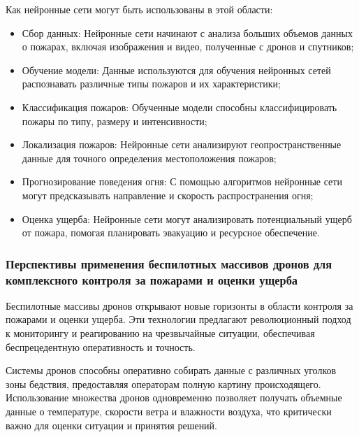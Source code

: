 Как нейронные сети могут быть использованы в этой области:
\begin{itemize}
	\item Сбор данных: Нейронные сети начинают с анализа больших объемов данных о пожарах, включая изображения и видео, полученные с дронов и спутников;
	\item Обучение модели: Данные используются для обучения нейронных сетей распознавать различные типы пожаров и их характеристики;
	\item Классификация пожаров: Обученные модели способны классифицировать пожары по типу, размеру и интенсивности;
	\item Локализация пожаров: Нейронные сети анализируют геопространственные данные для точного определения местоположения пожаров;
	\item Прогнозирование поведения огня: С помощью алгоритмов нейронные сети могут предсказывать направление и скорость распространения огня;
	\item Оценка ущерба: Нейронные сети могут анализировать потенциальный ущерб от пожара, помогая планировать эвакуацию и ресурсное обеспечение.
\end{itemize}

\subsubsection{Перспективы применения беспилотных массивов дронов для комплексного контроля за пожарами и оценки ущерба}
Беспилотные массивы дронов открывают новые горизонты в области контроля за пожарами и оценки ущерба. Эти технологии предлагают революционный подход к мониторингу и реагированию на чрезвычайные ситуации, обеспечивая беспрецедентную оперативность и точность.

Системы дронов способны оперативно собирать данные с различных уголков зоны бедствия, предоставляя операторам полную картину происходящего. Использование множества дронов одновременно позволяет получать объемные данные о температуре, скорости ветра и влажности воздуха, что критически важно для оценки ситуации и принятия решений.

